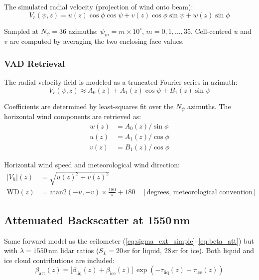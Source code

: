 \documentclass[11pt,letterpaper]{article}
\begin{document}
The simulated radial velocity (projection of wind onto beam):
\begin{equation}
  \boxed{V_r(\psi, z) = u(z)\cos\phi\cos\psi + v(z)\cos\phi\sin\psi + w(z)\sin\phi}
  \label{eq:vad_radial}
\end{equation}

Sampled at $N_\psi = 36$ azimuths: $\psi_m = m \times 10^\circ$, $m = 0, 1, \ldots, 35$.
Cell-centred $u$ and $v$ are computed by averaging the two enclosing face values.

\subsubsection{VAD Retrieval}

The radial velocity field is modeled as a truncated Fourier series in azimuth:
\begin{equation}
  V_r(\psi, z) \approx A_0(z) + A_1(z)\cos\psi + B_1(z)\sin\psi
  \label{eq:vad_fit}
\end{equation}

Coefficients are determined by least-squares fit over the $N_\psi$ azimuths.
The horizontal wind components are retrieved as:
\begin{align}
  w(z) &= A_0(z)/\sin\phi \label{eq:vad_w} \\
  u(z) &= A_1(z)/\cos\phi \label{eq:vad_u} \\
  v(z) &= B_1(z)/\cos\phi \label{eq:vad_v}
\end{align}

Horizontal wind speed and meteorological wind direction:
\begin{align}
  |V_h|(z) &= \sqrt{u(z)^2 + v(z)^2} \\
  \mathrm{WD}(z) &= \mathrm{atan2}(-u,-v)\times\frac{180}{\pi} + 180
  \quad [\text{degrees, meteorological convention}]
\end{align}

\subsection{Attenuated Backscatter at 1550\,nm}

Same forward model as the ceilometer (\autoref{eq:sigma_ext_simple}--\ref{eq:beta_att})
but with $\lambda = 1550$\,nm lidar ratios ($S_L = 20$\,sr for liquid, $28$\,sr for ice).
Both liquid and ice cloud contributions are included:
\begin{equation}
  \beta_\mathrm{att}(z) = \bigl[\beta_\mathrm{liq}(z) + \beta_\mathrm{ice}(z)\bigr]\,
  \exp\!\left(-\tau_\mathrm{liq}(z) - \tau_\mathrm{ice}(z)\right)
\end{equation}
\end{document}
